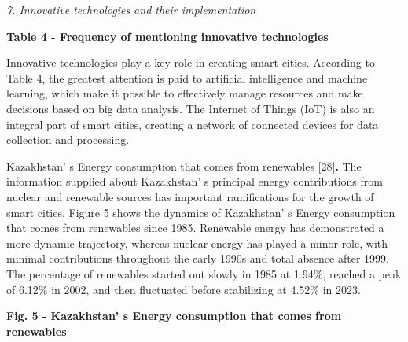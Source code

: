 \emph{7. Innovative technologies and their implementation}

{\bfseries Table 4 - Frequency of mentioning innovative technologies}


Innovative technologies play a key role in creating smart cities.
According to Table 4, the greatest attention is paid to artificial
intelligence and machine learning, which make it possible to effectively
manage resources and make decisions based on big data analysis. The
Internet of Things (IoT) is also an integral part of smart cities,
creating a network of connected devices for data collection and
processing.

Kazakhstan' s Energy consumption that comes from
renewables {[}28{]}{\bfseries .} The information supplied about
Kazakhstan' s principal energy contributions from nuclear
and renewable sources has important ramifications for the growth of
smart cities. Figure 5 shows the dynamics of
Kazakhstan' s Energy consumption that comes from
renewables since 1985. Renewable energy has demonstrated a more dynamic
trajectory, whereas nuclear energy has played a minor role, with minimal
contributions throughout the early 1990s and total absence after 1999.
The percentage of renewables started out slowly in 1985 at 1.94\%,
reached a peak of 6.12\% in 2002, and then fluctuated before stabilizing
at 4.52\% in 2023.

{\bfseries Fig. 5 - Kazakhstan' s Energy consumption that
comes from renewables}

